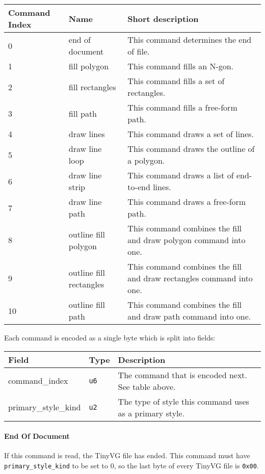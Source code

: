 \documentclass[]{article}
\begin{document}
\begin{longtable}[]{@{}p{1in}p{2in}p{3in}@{}}
\toprule
Command Index & Name & Short description \\
\midrule
\endhead
0 & end of document & This command determines the end of file. \\
1 & fill polygon & This command fills an N-gon. \\
2 & fill rectangles & This command fills a set of rectangles. \\
3 & fill path & This command fills a free-form path. \\
4 & draw lines & This command draws a set of lines. \\
5 & draw line loop & This command draws the outline of a polygon. \\
6 & draw line strip & This command draws a list of end-to-end lines. \\
7 & draw line path & This command draws a free-form path. \\
8 & outline fill polygon & This command combines the fill and draw
polygon command into one. \\
9 & outline fill rectangles & This command combines the fill and draw
rectangles command into one. \\
10 & outline fill path & This command combines the fill and draw path
command into one. \\
\bottomrule
\end{longtable}

Each command is encoded as a single byte which is split into fields:

\begin{longtable}[]{@{}p{1in}p{2in}p{3in}@{}}
\toprule
Field & Type & Description \\
\midrule
\endhead
command\_index & \texttt{u6} & The command that is encoded next. See
table above. \\
primary\_style\_kind & \texttt{u2} & The type of style this command uses
as a primary style. \\
\bottomrule
\end{longtable}

\hypertarget{end-of-document}{%
\paragraph{End Of Document}\label{end-of-document}}

If this command is read, the TinyVG file has ended. This command must
have \texttt{primary\_style\_kind} to be set to 0, so the last byte of
every TinyVG file is \texttt{0x00}.
\end{document}
